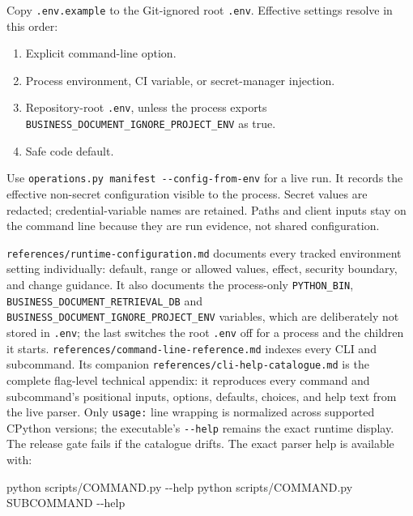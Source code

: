 \documentclass[
]{article}
\newenvironment{Shaded}{}{}
\newcommand{\AttributeTok}[1]{\textcolor[rgb]{0.49,0.56,0.16}{#1}}
\newcommand{\ExtensionTok}[1]{#1}
\newcommand{\NormalTok}[1]{#1}
\providecommand{\tightlist}{%
  \setlength{\itemsep}{0pt}\setlength{\parskip}{0pt}}
\begin{document}
Copy \texttt{.env.example} to the Git-ignored root \texttt{.env}.
Effective settings resolve in this order:

\begin{enumerate}
\def\labelenumi{\arabic{enumi}.}
\tightlist
\item
  Explicit command-line option.
\item
  Process environment, CI variable, or secret-manager injection.
\item
  Repository-root \texttt{.env}, unless the process exports
  \texttt{BUSINESS\_\allowbreak{}DOCUMENT\_\allowbreak{}IGNORE\_\allowbreak{}PROJECT\_\allowbreak{}ENV}
  as true.
\item
  Safe code default.
\end{enumerate}

Use \texttt{operations.py\ manifest\ -\/-config-from-env} for a live
run. It records the effective non-secret configuration visible to the
process. Secret values are redacted; credential-variable names are
retained. Paths and client inputs stay on the command line because they
are run evidence, not shared configuration.

\texttt{references/\allowbreak{}runtime-\allowbreak{}configuration.md}
documents every tracked environment setting individually: default, range
or allowed values, effect, security boundary, and change guidance. It
also documents the process-only \texttt{PYTHON\_\allowbreak{}BIN},
\texttt{BUSINESS\_\allowbreak{}DOCUMENT\_\allowbreak{}RETRIEVAL\_\allowbreak{}DB}
and
\texttt{BUSINESS\_\allowbreak{}DOCUMENT\_\allowbreak{}IGNORE\_\allowbreak{}PROJECT\_\allowbreak{}ENV}
variables, which are deliberately not stored in \texttt{.env}; the last
switches the root \texttt{.env} off for a process and the children it
starts.
\texttt{references/\allowbreak{}command-\allowbreak{}line-\allowbreak{}reference.md}
indexes every CLI and subcommand. Its companion
\texttt{references/\allowbreak{}cli-\allowbreak{}help-\allowbreak{}catalogue.md}
is the complete flag-level technical appendix: it reproduces every
command and subcommand's positional inputs, options, defaults, choices,
and help text from the live parser. Only \texttt{usage:} line wrapping
is normalized across supported CPython versions; the executable's
\texttt{-\/-help} remains the exact runtime display. The release gate
fails if the catalogue drifts. The exact parser help is available with:

\begin{Shaded}
\begin{Highlighting}[]
\ExtensionTok{python}\NormalTok{ scripts/COMMAND.py }\AttributeTok{{-}{-}help}
\ExtensionTok{python}\NormalTok{ scripts/COMMAND.py SUBCOMMAND }\AttributeTok{{-}{-}help}
\end{Highlighting}
\end{Shaded}
\end{document}
